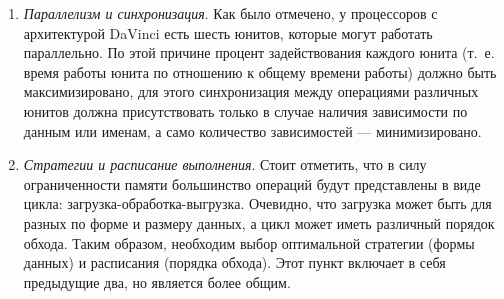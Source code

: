 \begin{enumerate}
    \item \textit{Параллелизм и синхронизация}. Как было отмечено, у процессоров
          с архитектурой DaVinci есть шесть юнитов, которые могут работать
          параллельно. По этой причине процент задействования каждого юнита
          (т.~е. время работы юнита по отношению к общему времени работы)
          должно быть максимизировано, для этого синхронизация между операциями
          различных юнитов должна присутствовать только в случае наличия
          зависимости по данным или именам, а само количество зависимостей ---
          минимизировано.

    \item \textit{Стратегии и расписание выполнения}. Стоит отметить, что в силу
          ограниченности памяти большинство операций будут представлены в виде
          цикла: загрузка-обработка-выгрузка. Очевидно, что загрузка может быть
          для разных по форме и размеру данных, а цикл может иметь различный
          порядок обхода. Таким образом, необходим выбор оптимальной стратегии
          (формы данных) и расписания (порядка обхода). Этот пункт включает
          в себя предыдущие два, но является более общим.
\end{enumerate}
